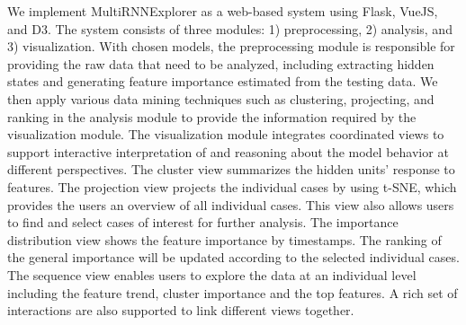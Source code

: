 We implement MultiRNNExplorer as a web-based system using Flask, VueJS, and D3. 
The system consists of three modules: 1) preprocessing, 2) analysis, and 3) visualization.
With chosen models, the preprocessing module is responsible for providing the raw data that need to be analyzed, including extracting hidden states and generating feature importance estimated from the testing data.
We then apply various data mining techniques such as clustering, projecting, and ranking in the analysis module to provide the information required by the visualization module.
The visualization module integrates coordinated views to support interactive interpretation of and reasoning about the model behavior at different perspectives. 
The cluster view summarizes the hidden units' response to features.
The projection view projects the individual cases by using t-SNE, which provides the users an overview of all individual cases.  This view also allows users to find and select cases of interest for further analysis.
The importance distribution view shows the feature importance by timestamps. The ranking of the general importance will be updated according to the selected individual cases.  
The sequence view enables users to explore the data at an individual level including the feature trend, cluster importance and the top features. 
A rich set of interactions are also supported to link different views together.





